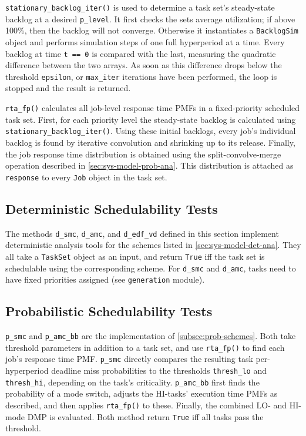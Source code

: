 \documentclass[a4paper,oneside]{csthesis}
\begin{document}
\texttt{stationary\_backlog\_iter()} is used to determine a task set's steady-state backlog at a desired \texttt{p\_level}. It first checks the sets average utilization; if above 100\%, then the backlog will not converge. Otherwise it instantiates a \texttt{BacklogSim} object and performs simulation steps of one full hyperperiod at a time. Every backlog at time \texttt{t == 0} is compared with the last, measuring the quadratic difference between the two arrays. As soon as this difference drops below the threshold \texttt{epsilon}, or \texttt{max\_iter} iterations have been performed, the loop is stopped and the result is returned.

\texttt{rta\_fp()} calculates all job-level response time PMFs in a fixed-priority scheduled task set. First, for each priority level the steady-state backlog is calculated using \texttt{stationary\_backlog\_iter()}. Using these initial backlogs, every job's individual backlog is found by iterative convolution and shrinking up to its release. Finally, the job response time distribution is obtained using the split-convolve-merge operation described in \cref{sec:sys-model-prob-ana}. This distribution is attached as \texttt{response} to every \texttt{Job} object in the task set.
\subsection{Deterministic Schedulability Tests}
The methods \texttt{d\_smc}, \texttt{d\_amc}, and \texttt{d\_edf\_vd} defined in this section implement deterministic analysis tools for the schemes listed in \cref{sec:sys-model-det-ana}. They all take a \texttt{TaskSet} object as an input, and return \texttt{True} iff the task set is schedulable using the corresponding scheme. For \texttt{d\_smc} and \texttt{d\_amc}, tasks need to have fixed priorities assigned (see \texttt{generation} module).
\subsection{Probabilistic Schedulability Tests}
\texttt{p\_smc} and \texttt{p\_amc\_bb} are the implementation of \cref{subsec:prob-schemes}. Both take threshold parameters in addition to a task set, and use \texttt{rta\_fp()} to find each job's response time PMF. \texttt{p\_smc} directly compares the resulting task per-hyperperiod deadline miss probabilities to the thresholds \texttt{thresh\_lo} and \texttt{thresh\_hi}, depending on the task's criticality. \texttt{p\_amc\_bb} first finds the probability of a mode switch, adjusts the HI-tasks' execution time PMFs as described, and then applies \texttt{rta\_fp()} to these. Finally, the combined LO- and HI-mode DMP is evaluated. Both method return \texttt{True} iff all tasks pass the threshold.
\end{document}
